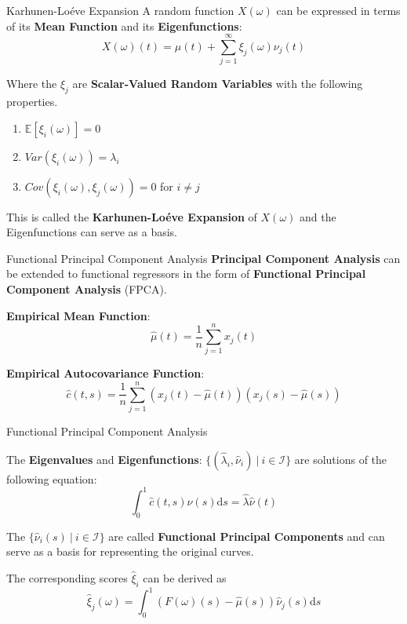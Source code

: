 \documentclass{beamer}
\begin{document}
	\begin{frame}{Karhunen-Lo\'{e}ve Expansion}\label{KLE}
		A random function $X(\omega)$ can be expressed in terms of its \textbf{Mean Function} and its \textbf{Eigenfunctions}:
		$$X(\omega)(t) = \mu(t) + \sum_{j = 1}^{\infty} \xi_j(\omega) \nu_j(t)$$
		
		Where the $\xi_j$ are \textbf{Scalar-Valued Random Variables} with the following properties.
		\begin{multicols}{2}
			\begin{enumerate}
				\item $\mathbb{E}[\xi_i(\omega)] = 0$
				\item $Var(\xi_i(\omega)) = \lambda_i$
				\item $Cov(\xi_i(\omega), \xi_j(\omega)) = 0$ for $i \neq j$
			\end{enumerate}
		\end{multicols}
		
		This is called the \textbf{Karhunen-Lo\'{e}ve Expansion} of $X(\omega)$ and the Eigenfunctions can serve as a basis. \\
		
		\hyperlink{spectral}{}
	\end{frame}

	\begin{frame}{Functional Principal Component Analysis}
		\textbf{Principal Component Analysis} can be extended to functional regressors in the form of \textbf{Functional Principal Component Analysis} (FPCA).
		\vspace{0.4cm}
		
		\textbf{Empirical Mean Function}:
		$$\hat{\mu}(t) = \frac{1}{n}\sum_{j = 1}^{n}x_j(t)$$

		\textbf{Empirical Autocovariance Function}:
		$$\hat{c}(t,s) = \frac{1}{n} \sum_{j = 1}^{n} \left(x_j(t) - \hat{\mu}(t)\right) \left(x_j(s) - \hat{\mu}(s)\right)$$

	\end{frame}

	\begin{frame}{Functional Principal Component Analysis}\label{FPCA}
	
		The \textbf{Eigenvalues} and \textbf{Eigenfunctions}: $\{(\hat{\lambda}_i, \hat{\nu}_i) \: \vert \: i \in \mathcal{I}\}$  are solutions of the following equation:
		$$ \int_{0}^{1}\hat{c}(t,s)\hat{\nu}(s) \mathrm{d}s = \hat{\lambda} \hat{\nu}(t) $$
		\vspace{0.2cm}
		
		The $\{\hat{\nu}_i(s) \: \vert \: i \in \mathcal{I}\}$ are called \textbf{Functional Principal Components} and can serve as a basis for representing the original curves. 
		\vspace{0.2cm}
		
		The corresponding scores $\hat{\xi}_i$ can be derived as
		$$\hat{\xi}_j(\omega) = \int_{0}^{1} (F(\omega)(s) - \hat{\mu}(s)) \hat{\nu}_j(s) \mathrm{d}s$$
		
		\hyperlink{PCA}{}
	\end{frame}
\end{document}
